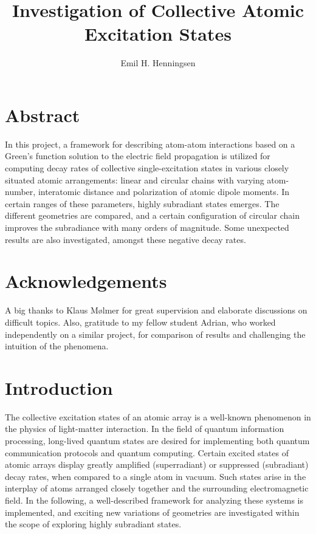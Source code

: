 \documentclass{article}
\author{Emil H. Henningsen}
\title{Investigation of Collective Atomic Excitation States}
\subtitle{}
\institute{Niels Bohr Institute}
\begin{document}
\maketitle

\section*{Abstract}

\noindent
In this project, a framework for describing atom-atom interactions based on a Green's function solution to the electric field propagation is utilized for computing decay rates of collective single-excitation states in various closely situated atomic arrangements: linear and circular chains with varying atom-number, interatomic distance and polarization of atomic dipole moments. In certain ranges of these parameters, highly subradiant states emerges. The different geometries are compared, and a certain configuration of circular chain improves the subradiance with many orders of magnitude. Some unexpected results are also investigated, amongst these negative decay rates. 

\section*{Acknowledgements}
\noindent
A big thanks to Klaus Mølmer for great supervision and elaborate discussions on difficult topics. Also, gratitude to my fellow student Adrian, who worked independently on a similar project, for comparison of results and challenging the intuition of the phenomena. 

\newpage
\tableofcontents

\section{Introduction}

\noindent
The collective excitation states of an atomic array is a well-known phenomenon in the physics of light-matter interaction. In the field of quantum information processing, long-lived quantum states are desired for implementing both quantum communication protocols and quantum computing. Certain excited states of atomic arrays display greatly amplified (superradiant) or suppressed (subradiant) decay rates, when compared to a single atom in vacuum. Such states arise in the interplay of atoms arranged closely together and the surrounding electromagnetic field. In the following, a well-described framework \cite{Asenjo} for analyzing these systems is implemented, and exciting new variations of geometries are investigated within the scope of exploring highly subradiant states. 
\end{document}
